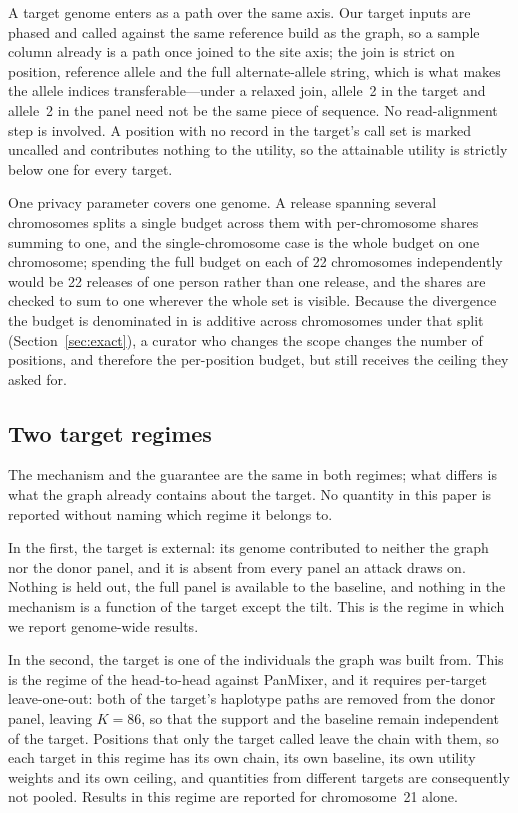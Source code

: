 A target genome enters as a path over the same axis. Our target inputs are phased
and called against the same reference build as the graph, so a sample column already
is a path once joined to the site axis; the join is strict on position, reference
allele and the full alternate-allele string, which is what makes the allele indices
transferable---under a relaxed join, allele~2 in the target and allele~2 in the panel
need not be the same piece of sequence. No read-alignment step is involved. A
position with no record in the target's call set is marked uncalled and contributes
nothing to the utility, so the attainable utility is strictly below one for every
target.

One privacy parameter covers one genome. A release spanning several chromosomes
splits a single budget across them with per-chromosome shares summing to one, and
the single-chromosome case is the whole budget on one chromosome; spending the full
budget on each of 22 chromosomes independently would be 22 releases of one person
rather than one release, and the shares are checked to sum to one wherever the whole
set is visible. Because the divergence the budget is denominated in is additive
across chromosomes under that split (Section~\ref{sec:exact}), a curator who changes
the scope changes the number of positions, and therefore the per-position budget,
but still receives the ceiling they asked for.

\subsection{Two target regimes}

The mechanism and the guarantee are the same in both regimes; what differs is what
the graph already contains about the target. No quantity in this paper is reported
without naming which regime it belongs to.

In the first, the target is external: its genome contributed to neither the graph nor
the donor panel, and it is absent from every panel an attack draws on. Nothing is
held out, the full panel is available to the baseline, and nothing in the mechanism
is a function of the target except the tilt. This is the regime in which we report
genome-wide results.

In the second, the target is one of the individuals the graph was built from. This is
the regime of the head-to-head against PanMixer, and it requires per-target
leave-one-out: both of the target's haplotype paths are removed from the donor panel,
leaving $K = 86$, so that the support and the baseline remain independent of the
target. Positions that only the target called leave the chain with them, so each
target in this regime has its own chain, its own baseline, its own utility weights
and its own ceiling, and quantities from different targets are consequently not
pooled. Results in this regime are reported for chromosome~21 alone.

